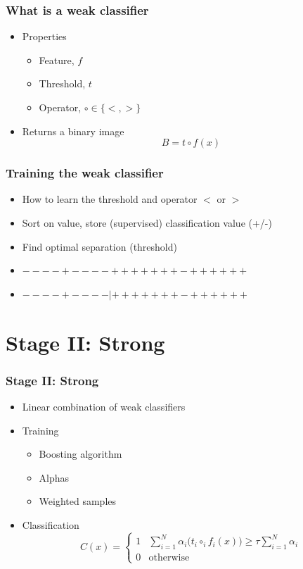 \documentclass{beamer}
\begin{document}
\frame
{
  \frametitle{What is a weak classifier}
	\begin{itemize}
		\item <+-| alert@+> Properties
			\begin{itemize}
				\item <+-| alert@+> Feature, $f$
				\item <+-| alert@+> Threshold, $t$
				\item <+-| alert@+> Operator, $\circ \in \{<, >\}$
			\end{itemize}
		\item <+-| alert@+> Returns a binary image
		\begin{displaymath}
		B = t \circ f(x)
		\end{displaymath}
	\end{itemize}
}
\frame
{
  \frametitle{Training the weak classifier}
	\begin{itemize}
		\item <+-| alert@+> How to learn the threshold and operator $<$ or $>$
		\item <+-| alert@+> Sort on value, store (supervised) classification value (+/-)
		\item <+-| alert@+> Find optimal separation (threshold)
		\item <+-| alert@+> $----+----+++++++-++++++$
		\item <+-| alert@+> $----+----|+++++++-++++++$
	\end{itemize}
}

\section{Stage II: Strong}
\frame
{
  \frametitle{Stage II: Strong}
	
  \begin{itemize}
  \item <+-| alert@+> Linear combination of weak classifiers
  \item <+-| alert@+> Training
  \begin{itemize}
  	\item Boosting algorithm
  	\item Alphas
  	\item Weighted samples
  \end{itemize}
  \item <+-| alert@+> Classification
	\begin{displaymath}
	C(x) = 
		\left\{ \begin{array}{ll}
			1 & \sum^N_{i=1} \alpha_i \big(t_i \circ_i f_i(x)\big) \ge \tau \sum^N_{i=1}\alpha_i \\
			0 & \textrm{otherwise}
		\end{array} \right.
	\end{displaymath}
  \end{itemize}
}
\end{document}
